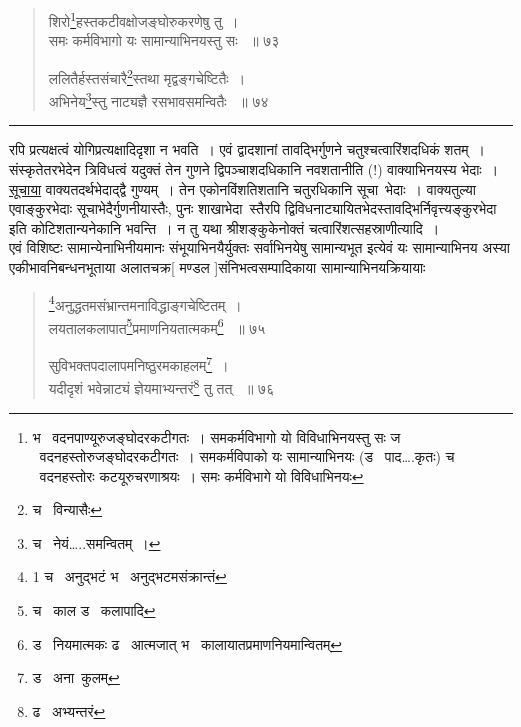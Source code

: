 \documentclass[11pt, openany]{book}
\begin{document}
{\begin{quote}
{शिरो\renewcommand{\thefootnote}{7}\footnote{भ \textendash\ वदनपाण्यूरुजङ्घोदरकटीगतः~। समकर्मविभागो यो विविधाभिनयस्तु सः ज \textendash\ वदनहस्तोरुजङ्घोदरकटीगतः~। समकर्मविपाको यः सामान्याभिनयः (ड \textendash\ पाद\ldots .कृतः) च \textendash\ वदनहस्तोरः कटयूरुचरणाश्रयः~। समः कर्मविभागे यो विविधाभिनयः}हस्तकटीवक्षोजङ्घोरुकरणेषु तु~।\\ 
समः कर्मविभागो यः सामान्याभिनयस्तु सः ~॥ ७३ 

ललितैर्हस्तसंचारै\renewcommand{\thefootnote}{8}\footnote{च \textendash\ विन्यासैः}स्तथा मृद्वङ्गचेष्टितैः~। \\
अभिनेय\renewcommand{\thefootnote}{9}\footnote{च \textendash\ नेयं\ldots ..समन्वितम्~। }स्तु नाट्यज्ञै रसभावसमन्वितैः ~॥ ७४ }
\end{quote}

\hrule

\vspace{2mm}

\noindent
रपि प्रत्यक्षत्वं योगिप्रत्यक्षादिदृशा न भवति~। एवं द्वादशानां तावद्भिर्गुणने चतुश्चत्वारिंशदधिकं शतम्~। संस्कृतेतरभेदेन त्रिविधत्वं यदुक्तं तेन गुणने द्विपञ्चाशदधिकानि नवशतानीति (!) वाक्याभिनयस्य भेदाः~। \underline{सूचाया} वाक्यतदर्थभेदाद्द्वै गुण्यम्~। तेन एकोनविंशतिशतानि चतुरधिकानि सूचा\textendash\ भेदाः~। वाक्यतुल्या एवाङ्कुरभेदाः सूचाभेदैर्गुणनीयास्तैः, पुनः शाखाभेदा\textendash\ स्तैरपि द्विविधनाट्यायितभेदस्तावद्भिर्निवृत्त्यङ्कुरभेदा इति कोटिशतान्यनेकानि भवन्ति~। न तु यथा श्रीशङ्कुकेनोक्तं चत्वारिंशत्सहस्राणीत्यादि~। \\

एवं विशिष्टः सामान्येनाभिनीयमानः संभूयाभिनयैर्युक्तः सर्वाभिनयेषु सामान्यभूत इत्येवं यः सामान्याभिनय अस्या एकीभावनिबन्धनभूताया अलातचक्र[ मण्डल ]संनिभत्वसम्पादिकाया सामान्याभिनयक्रियायाः 

\newpage

\begin{quote}
 {\na \renewcommand{\thefootnote}{1}\footnote{1 च \textendash\ अनुद्भटं भ \textendash\ अनुद्भटमसंक्रान्तं}अनुद्धतमसंभ्रान्तमनाविद्धाङ्गचेष्टितम्~।\\ 
लयतालकलापात\renewcommand{\thefootnote}{2}\footnote{च \textendash\ काल ड \textendash\ कलापादि}प्रमाणनियतात्मकम्\renewcommand{\thefootnote}{3}\footnote{ड \textendash\ नियमात्मकः ढ \textendash\ आत्मजात् भ \textendash\ कालायातप्रमाणनियमान्वितम् } ~॥ ७५ 

सुविभक्तपदालापमनिष्ठुरमकाहलम्\renewcommand{\thefootnote}{4}\footnote{ड \textendash\ अना\textendash\ कुलम्}~।\\ यदीदृशं भवेन्नाट्यं ज्ञेयमाभ्यन्तरं\renewcommand{\thefootnote}{5}\footnote{ढ \textendash\ अभ्यन्तरं} तु तत् ~॥ ७६ 

}
\end{quote}}
\end{document}
